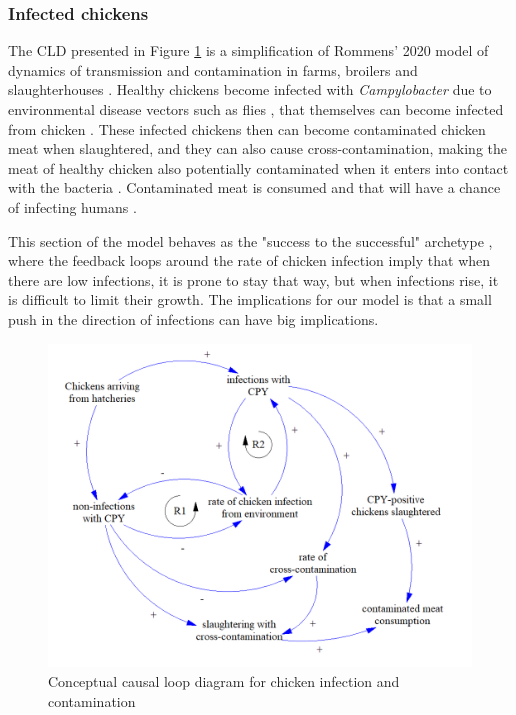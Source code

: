 \subsubsection*{Infected chickens}
The CLD presented in Figure \ref{fig:transmission_submodel} is a simplification of Rommens' 2020 model of dynamics of transmission  and contamination in farms, broilers and slaughterhouses \parencite{rommens_infected_2020}. Healthy chickens become infected with \textit{Campylobacter} due to environmental disease vectors such as flies \parencite{royden_role_2016}, that themselves can become infected from chicken \parencite{skovgard_retention_2011}. These infected chickens then can become contaminated chicken meat when slaughtered, and they can also cause cross-contamination, making the meat of healthy chicken also potentially contaminated when it enters into contact with the bacteria \parencite{berndtson_campylobacter_1996}. Contaminated meat is consumed and that will have a chance of infecting humans \parencite{wilson_tracing_2008}.

This section of the model behaves as the "success to the successful" archetype \parencite{pruyt_triple_2013}, where the feedback loops around the rate of chicken infection imply that when there are low infections, it is prone to stay that way, but when infections rise, it is difficult to limit their growth. The implications for our model is that a small push in the direction of infections can have big implications.

\begin{figure}[h]
\centering
\includegraphics[width=1\textwidth]{images/Transmission submodel.png}
\caption{Conceptual causal loop diagram for chicken infection and contamination}
\label{fig:transmission_submodel}
\end{figure}

